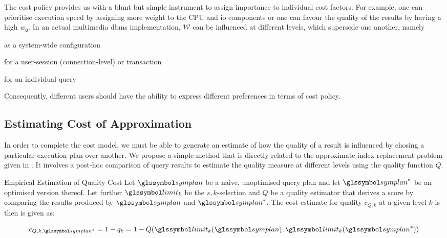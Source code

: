 The cost policy provides us with a blunt but simple instrument to assign importance to individual cost factors. For example, one can prioritise execution speed by assigning more weight to the CPU and \acrshort{io} components or one can favour the quality of the results by having a high $w_{\mathtt{Q}}$. In an actual multimedia \acrshort{dbms} implementation, $\mathcal{W}$ can be influenced at different levels, which supersede one another, namely 
\begin{enumerate*}[label=(\roman*), itemjoin={{, }}, itemjoin*={{, or }}, after={{.}}]
    \item as a system-wide configuration
    \item for a user-session (connection-level) or transaction
    \item for an individual query
\end{enumerate*} 
Consequently, different users should have the ability to express different preferences in terms of cost policy.

\subsection{Estimating Cost of Approximation}
\label{section:quality_cost_estimation}

In order to complete the cost model, we must be able to generate an estimate of how the quality of a result is influenced by chosing a particular execution plan over another. We propose a simple method that is directly related to the approximate index replacement problem given in . It involves a post-hoc comparison of query results to estimate the quality measure at different levels using the quality function $Q$.

\begin{definition}[label=definition:cost_estimation_quality]{Empirical Estimation of Quality Cost}{}
    Let $\symplan$ be a naive, unoptimised query plan and let $\symplan^{*}$ be an optimised version thereof. Let further $\limit_k$ be the $s,k$-selection and $Q$ be a quality estimator that derives a score by comparing the results produced by $\symplan$ and $\symplan^{*}$. The cost estimate for quality $c_{Q,k}$ at a given level $k$ is then is given as:
    
    \begin{equation*}
        c_{Q,k,\symplan^{*}} = 1 - q_k = 1 - Q(\limit_k(\symplan),\limit_k(\symplan^{*}))
    \end{equation*}
\end{definition}

